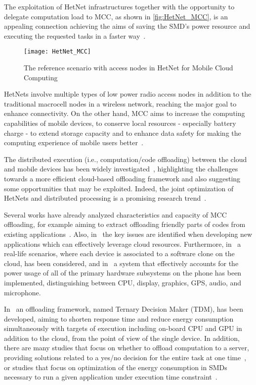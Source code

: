 \documentclass[twoside,openright]{report}
\begin{document}
The exploitation of \gls{HetNet} infrastructures together with the opportunity to delegate computation load to \gls{MCC}, as shown in \autoref{fig:HetNet_MCC},  is an appealing connection achieving the aims of saving the \gls{SMD}'s power resource and executing the requested tasks in a faster way~\cite{Challenges}.
\begin{figure}[tbp]
\centering
\texttt{[image: HetNet\_MCC]}
\caption{The reference scenario with access nodes in HetNet for Mobile Cloud Computing}
\label{fig:HetNet_MCC}
\end{figure}
\glspl{HetNet} involve multiple types of low power radio access nodes in addition to the traditional macrocell nodes in a wireless network, reaching the major goal to enhance connectivity. On the other hand, \gls{MCC} aims to increase the computing capabilities of mobile devices, to conserve local resources - especially battery charge - to extend storage capacity and to enhance data safety for making the computing experience of mobile users better~\cite{Cloud-based}.

The distributed execution (i.e., computation/code offloading) between the cloud and mobile devices has been widely investigated~\cite{DinhSurvey}, highlighting the challenges towards a more efficient cloud-based offloading framework and also suggesting some opportunities that may be exploited.
Indeed, the joint optimization of \glspl{HetNet} and distributed processing is a promising research trend~\cite{fantacci09}.

Several works have already analyzed characteristics and capacity of \gls{MCC} offloading, for example aiming to extract offloading friendly parts of codes from existing applications~\cite{CuervoMAUI, CloneCloudChun}. 
Also, in~\cite{MobileMeetCloud} the key issues are identified when developing new applications which can effectively leverage cloud resources.  
Furthermore, in~\cite{Barbera} a real-life scenarios, where each device is associated to a software clone on the cloud, has been considered, and in~\cite{Murmuria} a system that effectively accounts for the power usage of all of the primary hardware subsystems on the phone has been implemented, distinguishing between CPU, display, graphics, GPS, audio, and microphone. 

In~\cite{Time-and-Energy-Aware} an offloading framework, named Ternary Decision Maker (TDM), has been developed, aiming to shorten response time and reduce energy consumption simultaneously with targets of execution including on-board CPU and GPU in addition to the cloud, from the point of view of the single device. 
In addition, there are many studies that focus on whether to offload computation to a server, providing solutions related to a yes/no decision for the entire task at one time~\cite{Kumar,Tradeoff}, or studies that focus on optimization of the energy consumption in \glspl{SMD} necessary to run a given application under execution time constraint~\cite{Barbarossa1}.
\end{document}
